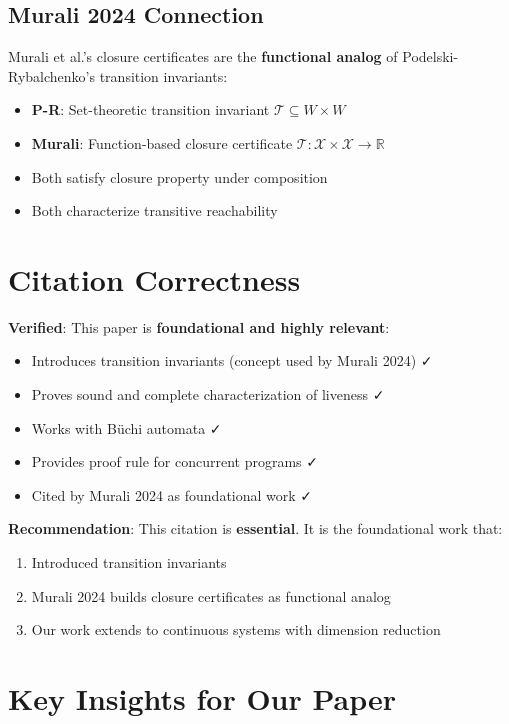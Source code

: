 \documentclass{article}
\begin{document}
\subsection{Murali 2024 Connection}

Murali et al.'s closure certificates are the \textbf{functional analog} of Podelski-Rybalchenko's transition invariants:

\begin{itemize}
    \item \textbf{P-R}: Set-theoretic transition invariant $\mathcal{T} \subseteq W \times W$
    \item \textbf{Murali}: Function-based closure certificate $\mathcal{T}: \mathcal{X} \times \mathcal{X} \to \mathbb{R}$
    \item Both satisfy closure property under composition
    \item Both characterize transitive reachability
\end{itemize}

\section{Citation Correctness}

\textbf{Verified}: This paper is \textbf{foundational and highly relevant}:
\begin{itemize}
    \item Introduces transition invariants (concept used by Murali 2024) ✓
    \item Proves sound and complete characterization of liveness ✓
    \item Works with Büchi automata ✓
    \item Provides proof rule for concurrent programs ✓
    \item Cited by Murali 2024 as foundational work ✓
\end{itemize}

\textbf{Recommendation}: This citation is \textbf{essential}. It is the foundational work that:
\begin{enumerate}
    \item Introduced transition invariants
    \item Murali 2024 builds closure certificates as functional analog
    \item Our work extends to continuous systems with dimension reduction
\end{enumerate}

\section{Key Insights for Our Paper}
\end{document}
